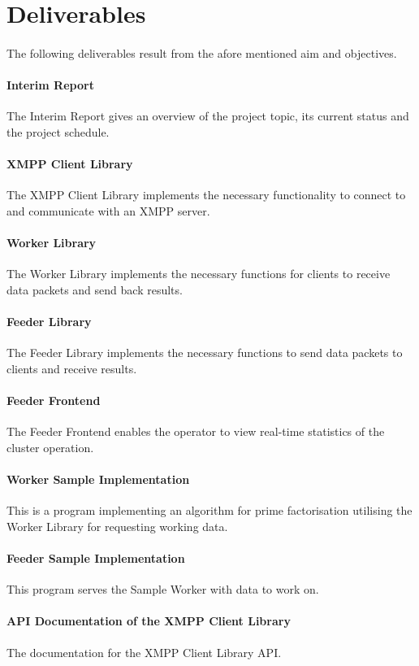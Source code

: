\section{Deliverables}
\paragraph{}
The following deliverables result from the afore mentioned aim and objectives.

\paragraph{Interim Report} The Interim Report gives an overview of the project topic, its current status and the project schedule.
\paragraph{XMPP Client Library} The XMPP Client Library implements the necessary functionality to connect to and communicate with an XMPP server.
\paragraph{Worker Library} The Worker Library implements the necessary functions for clients to receive data packets and send back results.
\paragraph{Feeder Library} The Feeder Library implements the necessary functions to send data packets to clients and receive results.
\paragraph{Feeder Frontend} The Feeder Frontend enables the operator to view real-time statistics of the cluster operation.
\paragraph{Worker Sample Implementation} This is a program implementing an algorithm for prime factorisation utilising the Worker Library for requesting working data.
\paragraph{Feeder Sample Implementation} This program serves the Sample Wor\-ker with data to work on.
\paragraph{API Documentation of the XMPP Client Library} The documentation for the XMPP Client Library API.
